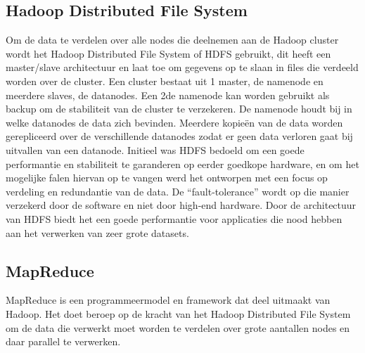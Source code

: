 \subsection{Hadoop Distributed File System}
Om de data te verdelen over alle nodes die deelnemen aan de Hadoop cluster wordt het Hadoop Distributed File System of HDFS gebruikt, dit heeft een \newline master/slave architectuur en laat toe om gegevens op te slaan in files die verdeeld worden over de cluster. Een cluster bestaat uit 1 master, de namenode en meerdere slaves, de datanodes. Een 2de namenode kan worden gebruikt als backup om de stabiliteit van de cluster te verzekeren.
\newline
De namenode houdt bij in welke datanodes de data zich bevinden. Meerdere kopieën van de data worden gerepliceerd over de verschillende datanodes zodat er geen data verloren gaat bij uitvallen van een datanode.
\newline
\newline
Initieel was HDFS bedoeld om een goede performantie en stabiliteit te garanderen op eerder goedkope hardware, en om het mogelijke falen hiervan op te vangen werd het ontworpen met een focus op verdeling en redundantie van de data. De ``fault-tolerance'' wordt op die manier verzekerd door de software en niet door high-end hardware.
Door de architectuur van HDFS biedt het een goede performantie voor applicaties die nood hebben aan het verwerken van zeer grote datasets.\autocite{Borthakur2007}
\newline
\newline
\subsection{MapReduce}
MapReduce is een programmeermodel en framework dat deel uitmaakt van Hadoop. Het doet beroep op de kracht van het Hadoop Distributed File System om de data die verwerkt moet worden te verdelen over grote aantallen nodes en daar parallel te verwerken.\autocite{Talend2023}

